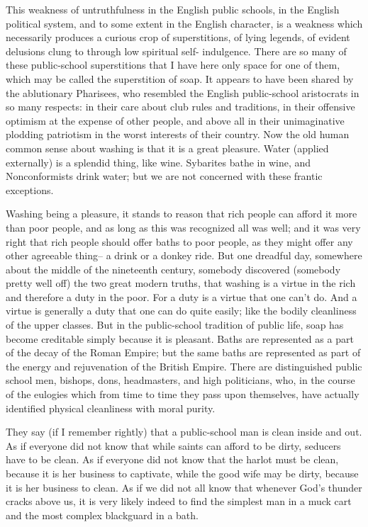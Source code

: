 \documentclass[final,10pt,letterpaper,twocolumn,openany]{book}
\begin{document}
This weakness of untruthfulness in the English public schools, in the
English political system, and to some extent in the English character, is a
weakness which necessarily produces a curious crop of superstitions, of
lying legends, of evident delusions clung to through low spiritual self-
indulgence. There are so many of these public-school superstitions that I
have here only space for one of them, which may be called the superstition
of soap. It appears to have been shared by the ablutionary Pharisees, who
resembled the English public-school aristocrats in so many respects: in
their care about club rules and traditions, in their offensive optimism at the
expense of other people, and above all in their unimaginative plodding
patriotism in the worst interests of their country. Now the old human
common sense about washing is that it is a great pleasure. Water (applied
externally) is a splendid thing, like wine. Sybarites bathe in wine, and
Nonconformists drink water; but we are not concerned with these frantic
exceptions. 

Washing being a pleasure, it stands to reason that rich people
can afford it more than poor people, and as long as this was recognized all
was well; and it was very right that rich people should offer baths to poor
people, as they might offer any other agreeable thing-- a drink or a donkey
ride. But one dreadful day, somewhere about the middle of the nineteenth
century, somebody discovered (somebody pretty well off) the two great
modern truths, that washing is a virtue in the rich and therefore a duty in
the poor. For a duty is a virtue that one can't do. And a virtue is generally a
duty that one can do quite easily; like the bodily cleanliness of the upper
classes. But in the public-school tradition of public life, soap has become
creditable simply because it is pleasant. Baths are represented as a part of
the decay of the Roman Empire; but the same baths are represented as part
of the energy and rejuvenation of the British Empire. There are
distinguished public school men, bishops, dons, headmasters, and high
politicians, who, in the course of the eulogies which from time to time
they pass upon themselves, have actually identified physical cleanliness
with moral purity.

They say (if I remember rightly) that a public-school
man is clean inside and out. As if everyone did not know that while saints
can afford to be dirty, seducers have to be clean. As if everyone did not
know that the harlot must be clean, because it is her business to captivate,
while the good wife may be dirty, because it is her business to clean. As if
we did not all know that whenever God's thunder cracks above us, it is
very likely indeed to find the simplest man in a muck cart and the most
complex blackguard in a bath.
\end{document}
